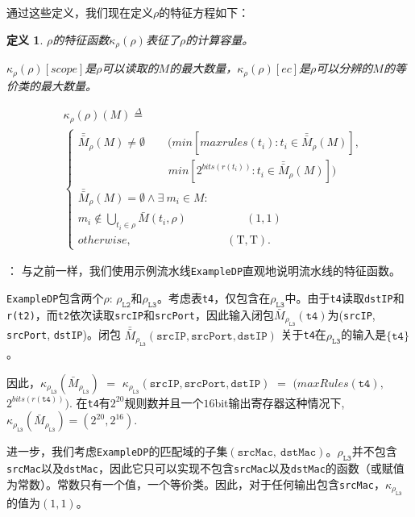 \documentclass{ctexart}
\newcommand{\exampledp}{\texttt{ExampleDP}}
\newcommand{\para}[1]{\smallskip\noindent {\bf #1}}
\newtheorem{definition}{定义}
\begin{document}
通过这些定义，我们现在定义$\rho$的特征方程如下：
\begin{definition} {\em $\rho$的特征函数$\kappa_\rho(\rho)$}表征了$\rho$的计算容量。

$\kappa_\rho(\rho)[scope]$是$\rho$可以读取的$M$的最大数量，$\kappa_\rho(\rho)[ec]$是$\rho$可以分辨的$M$的等价类的最大数量。

\begin{equation*}
\begin{split}
&\kappa_\rho(\rho)(M) \overset{\Delta}{=}\\
&\begin{cases}
\bar{\bar{M}}_\rho(M) \neq \emptyset \quad \quad (min[maxrules(t_i) : t_i \in \bar{\bar{M}}_\rho(M)],\\
\quad \quad \quad \quad \quad \quad \quad \quad  min[2^{bits(r(t_i))} : t_i \in \bar{\bar{M}}_\rho(M)])\\
\bar{\bar{M}}_\rho(M) = \emptyset \wedge \exists\ m_i \in M :\\
m_i \notin \bigcup_{t_i \in \rho} \bar{M}(t_i, \rho)\  \quad \quad \quad \quad \quad (1, 1)\\
otherwise, \quad \quad \quad \quad \quad \quad \quad \ \ \ \ \, \, \,  (\mathrm{T}, \mathrm{T}). %
\end{cases}
\end{split}
\end{equation*}
\end{definition}

\para{示例}： 与之前一样，我们使用示例流水线\exampledp 直观地说明流水线的特征函数。

\exampledp{}包含两个$\rho$: $\rho_{\texttt{L2}}$和$\rho_{\texttt{L3}}$。考虑表\texttt{t4}，仅包含在$\rho_{\texttt{L3}}$中。由于\texttt{t4}读取\texttt{dstIP}和\texttt{r(t2)}，而\texttt{t2}依次读取\texttt{srcIP}和\texttt{srcPort}，因此输入闭包$\bar{M}_{\rho_{\texttt{L3}}}(\texttt{t4})$为(\texttt{srcIP}, \texttt{srcPort}, \texttt{dstIP})。闭包 $\bar{\bar{M}}_{\rho_\texttt{L3}}(\texttt{srcIP}, \texttt{srcPort}, \texttt{dstIP})$ 关于\texttt{t4}在$\rho_{\texttt{L3}}$的输入是$\{\texttt{t4}\}$。


因此，$\kappa_{\rho_{\texttt{L3}}}(\bar{M}_{\rho_{\texttt{L3}}})$ $=$ $\kappa_{\rho_{\texttt{L3}}}(\texttt{srcIP}, \texttt{srcPort}, \texttt{dstIP})$ $=$ $(maxRules(\texttt{t4}),$ $2^{bits(r(\texttt{t4}))})$. 在\texttt{t4}有$2^{20}$规则数并且一个$16$bit输出寄存器这种情况下, $\kappa_{\rho_{\texttt{L3}}}(\bar{M}_{\rho_{\texttt{L3}}}) = (2^{20}, 2^{16})$.

进一步，我们考虑\exampledp{}的匹配域的子集$(\texttt{srcMac},\ \texttt{dstMac})$。$\rho_{\texttt{L3}}$并不包含\texttt{srcMac}以及\texttt{dstMac}，因此它只可以实现不包含\texttt{srcMac}以及\texttt{dstMac}的函数（或赋值为常数）。常数只有一个值，一个等价类。因此，对于任何输出包含\texttt{srcMac}，$\kappa_{\rho_{\texttt{L3}}}$的值为$(1, 1)$。
\end{document}
